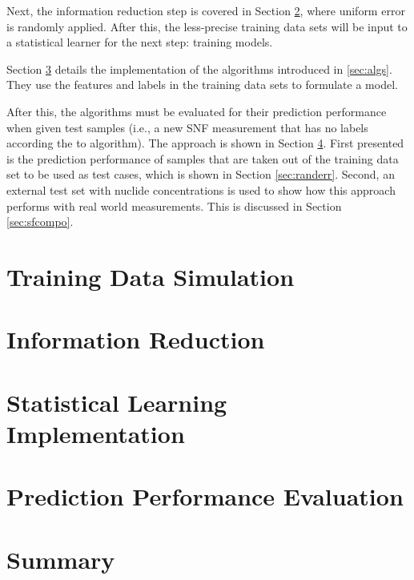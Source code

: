 Next, the information reduction step is covered in Section
\ref{sec:inforeduc1}, where uniform error is randomly applied. After this, the
less-precise training data sets will be input to a statistical learner for the
next step: training models.

Section \ref{sec:statmodel1} details the implementation of the algorithms
introduced in \ref{sec:algs}. They use the features and labels in the training
data sets to formulate a model. 

After this, the algorithms must be evaluated for their prediction performance
when given test samples (i.e., a new \gls{SNF} measurement that has no labels
according the to algorithm).  The approach is shown in Section \ref{sec:eval1}.
First presented is the prediction performance of samples that are taken out of
the training data set to be used as test cases, which is shown in Section
\ref{sec:randerr}.  Second, an external test set with nuclide concentrations is
used to show how this approach performs with real world measurements. This is
discussed in Section \ref{sec:sfcompo}.  

\section{Training Data Simulation}
\label{sec:training1}


\section{Information Reduction}
\label{sec:inforeduc1}


\section{Statistical Learning Implementation}
\label{sec:statmodel1}


\section{Prediction Performance Evaluation}
\label{sec:eval1}


\section{Summary}


